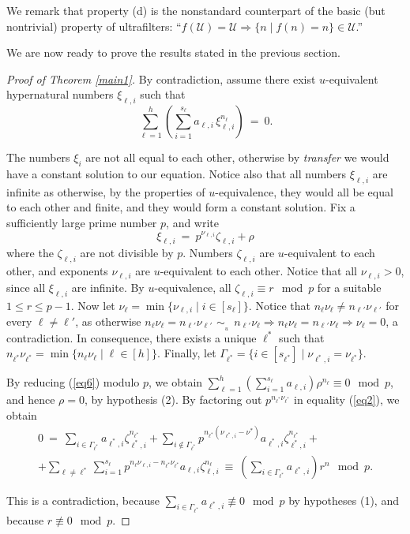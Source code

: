 \documentclass[11pt]{amsart}
\theoremstyle{definition}
\theoremstyle{remark}
\numberwithin{equation}{section}
\begin{document}
We remark that property (d) is the nonstandard counterpart
of the basic (but nontrivial) property of ultrafilters:
``$f({\mathcal{U}})={\mathcal{U}}\Rightarrow\{n\mid f(n)=n\}\in{\mathcal{U}}$.''

\smallskip
We are now ready to prove the results stated in the previous section.

\smallskip
\begin{proof}[Proof of Theorem \ref{main1}]
By contradiction, assume there exist $u$-equivalent
hypernatural numbers
$\xi_{\ell,i}$ 
such that 
\begin{equation}\label{eq6}
\sum_{\ell=1}^h 
\left(\sum_{i=1}^{s_\ell}a_{\ell,i}\,\xi_{\ell,i}^{n_\ell}\right)\ =\ 0.
\end{equation}

The numbers $\xi_i$ are not all equal to each other,
otherwise by \emph{transfer} we would have a constant
solution to our equation.
Notice also that all numbers $\xi_{\ell,i}$ are infinite as otherwise,
by the properties of $u$-equi\-valence, they would all be equal 
to each other and finite, and they would form a constant solution. 
Fix a sufficiently large prime number $p$,
and write 
$$\xi_{\ell,i}\ =\ p^{\nu_{\ell,i}}\zeta_{\ell,i}+\rho$$
where the $\zeta_{\ell,i}$ are not divisible by $p$.
Numbers $\zeta_{\ell,i}$ are $u$-equivalent
to each other,  and exponents $\nu_{\ell,i}$ are $u$-equivalent
to each other. Notice that all $\nu_{\ell,i}>0$,
since all $\xi_{\ell,i}$ are infinite.
By $u$-equivalence, 
all $\zeta_{\ell,i}\equiv r\mod p$
for a suitable $1\le r\le p-1$.
Now let $\nu_\ell=\min\{\nu_{\ell,i}\mid i\in[s_\ell]\}$.
Notice that $n_\ell\nu_\ell\ne n_{\ell'}\nu_{\ell'}$
for every $\ell\ne\ell'$, as otherwise
$n_\ell\nu_\ell=n_{\ell'}\nu_{\ell'}\,{{\,{\sim}_{{}_{\!\!\!\!\! u}}\;}}\,n_{\ell'}\nu_\ell
\Rightarrow n_\ell\nu_\ell=n_{\ell'}\nu_\ell\Rightarrow \nu_\ell=0$,
a contradiction. In consequence, 
there exists a unique $\ell^*$
such that $n_{\ell^*}\nu_{\ell^*}=\min\{n_\ell\nu_\ell\mid\ell\in[h]\}$.
Finally, let 
$\Gamma_{\ell^*}=\{i\in[s_{\ell^*}]\mid \nu_{\ell^*\!,i}=\nu_{\ell^*}\}$.

By reducing (\ref{eq6}) modulo $p$, we obtain
$\sum_{\ell=1}^h 
\left(\sum_{i=1}^{s_\ell}a_{\ell,i}\right)\rho^{n_\ell}\equiv 0\mod p$,
and hence $\rho=0$, by hypothesis (2). 
By factoring out $p^{n_{\ell^*}\nu_{\ell^*}}$ 
in equality (\ref{eq2}), we obtain
\begin{multline*}
0\ =\ \sum_{i\in\Gamma_{\ell^*}}a_{\ell^*\!,i}\zeta_{\ell^*\!,i}^{n_{\ell^*}}+
\sum_{i\notin\Gamma_{\ell^*}}
p^{n_{\ell^*}(\nu_{\ell^*\!,i}-\nu^*)}
a_{\ell^*\!,i}\zeta_{\ell^*\!,i}^{n_{\ell^*}}+
\\
+\sum_{\ell\ne\ell^*}\sum_{i=1}^{s_\ell} 
p^{n_\ell\nu_{\ell,i}-n_{\ell^*}\nu_{\ell^*}}
a_{\ell,i}\zeta_{\ell,i}^{n_\ell}\ \equiv\ 
\left(\sum_{i\in\Gamma_{\ell^*}}a_{\ell^*\!,i}\right)\!r^n\mod p.
\end{multline*}

This is a contradiction, because 
$\sum_{i\in\Gamma_{\ell^*}}a_{\ell^*\!,i}\not\equiv 0\mod p$
by hypotheses (1), and because $r\not\equiv 0\mod p$.
\end{proof}
\end{document}
